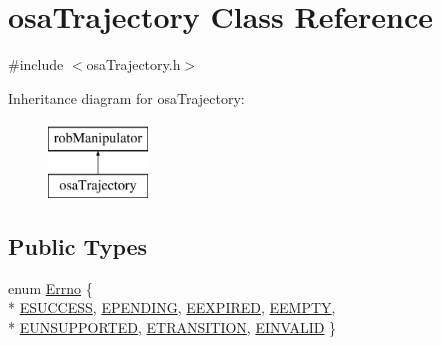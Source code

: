 \hypertarget{classosa_trajectory}{\section{osa\-Trajectory Class Reference}
\label{classosa_trajectory}
}


{\ttfamily \#include $<$osa\-Trajectory.\-h$>$}

Inheritance diagram for osa\-Trajectory\-:\begin{figure}[H]
\begin{center}
\leavevmode
\includegraphics[height=2.000000cm]{d9/df1/classosa_trajectory}
\end{center}
\end{figure}
\subsection*{Public Types}
\begin{DoxyCompactItemize}
\item 
enum \hyperlink{classosa_trajectory_a9d6482436bb2b9a6c0513e2811ab79fc}{Errno} \{ \\*
\hyperlink{classosa_trajectory_a9d6482436bb2b9a6c0513e2811ab79fca3f4a62b11a8cddeaae5ae88117afddf8}{E\-S\-U\-C\-C\-E\-S\-S}, 
\hyperlink{classosa_trajectory_a9d6482436bb2b9a6c0513e2811ab79fcaa36d48a80aee1eb3e217e7195146b0cb}{E\-P\-E\-N\-D\-I\-N\-G}, 
\hyperlink{classosa_trajectory_a9d6482436bb2b9a6c0513e2811ab79fca7c6f299c4c65be5ac109d3c5b10ce9da}{E\-E\-X\-P\-I\-R\-E\-D}, 
\hyperlink{classosa_trajectory_a9d6482436bb2b9a6c0513e2811ab79fcae33391e7475ed0edfd26659e436e792a}{E\-E\-M\-P\-T\-Y}, 
\\*
\hyperlink{classosa_trajectory_a9d6482436bb2b9a6c0513e2811ab79fca04a63d5d5f5b993c63b12cf0a1f0ffdf}{E\-U\-N\-S\-U\-P\-P\-O\-R\-T\-E\-D}, 
\hyperlink{classosa_trajectory_a9d6482436bb2b9a6c0513e2811ab79fca563d9819010932267d5ad64b13fc5790}{E\-T\-R\-A\-N\-S\-I\-T\-I\-O\-N}, 
\hyperlink{classosa_trajectory_a9d6482436bb2b9a6c0513e2811ab79fca86ecf16dffea71f89b9c93c1e3a5fd58}{E\-I\-N\-V\-A\-L\-I\-D}
 \}
\end{DoxyCompactItemize}
